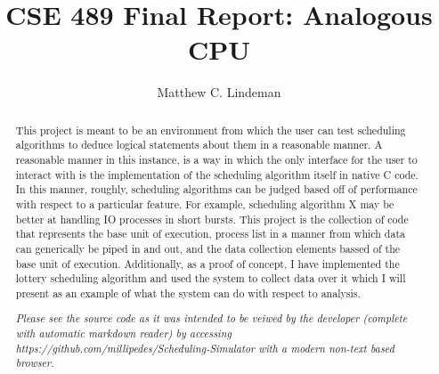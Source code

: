\documentclass[acmsmall]{acmart}
\begin{document}
\title{CSE 489 Final Report: Analogous CPU}

\author{Matthew C. Lindeman}

\renewcommand{\shortauthors}{Matthew C. Lindeman}

\begin{abstract}
  This project is meant to be an environment from which the user can test
  scheduling algorithms to deduce logical statements about them in a reasonable
  manner. A reasonable manner in this instance, is a way in which the only
  interface for the user to interact with is the implementation of the
  scheduling algorithm itself in native C code. In this manner, roughly, scheduling algorithms
  can be judged based off of performance with respect to a particular feature.
  For example, scheduling algorithm X may be better at handling IO processes in
  short bursts. This project is the collection of code that represents the base
  unit of execution, process list in a manner from which data can
  generically be piped in and out, and the data collection elements bassed of
  the base unit of execution. Additionally, as a proof of concept, I have
  implemented the lottery scheduling algorithm and used the system to collect
  data over it which I will present as an example of what the system can do with
  respect to analysis.
  \par
  {\it Please see the source code as it was intended to be veiwed by the developer
  (complete with automatic markdown reader) by accessing
  https://github.com/millipedes/Scheduling-Simulator with a modern non-text
  based browser.}
\end{abstract}
\end{document}
